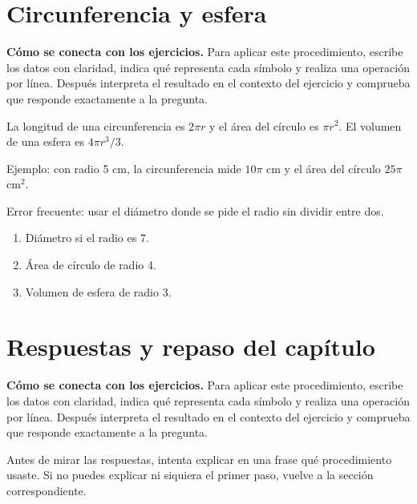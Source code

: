 \documentclass[10pt,oneside,openany]{book}
\begin{document}
\section{Circunferencia y esfera}

\textbf{Cómo se conecta con los ejercicios.} Para aplicar este procedimiento, escribe los datos con claridad, indica qué representa cada símbolo y realiza una operación por línea. Después interpreta el resultado en el contexto del ejercicio y comprueba que responde exactamente a la pregunta.

La longitud de una circunferencia es $2\pi r$ y el área del círculo es $\pi r^2$. El volumen de una esfera es $4\pi r^3/3$.

\begin{ejemplo}
Ejemplo: con radio 5 cm, la circunferencia mide $10\pi$ cm y el área del círculo $25\pi$ cm$^2$.
\end{ejemplo}

\begin{ojo}
Error frecuente: usar el diámetro donde se pide el radio sin dividir entre dos.
\end{ojo}

\begin{practica}

\begin{enumerate}

\item Diámetro si el radio es 7.

\item Área de círculo de radio 4.

\item Volumen de esfera de radio 3.

\end{enumerate}

\end{practica}



\section{Respuestas y repaso del capítulo}

\textbf{Cómo se conecta con los ejercicios.} Para aplicar este procedimiento, escribe los datos con claridad, indica qué representa cada símbolo y realiza una operación por línea. Después interpreta el resultado en el contexto del ejercicio y comprueba que responde exactamente a la pregunta.

Antes de mirar las respuestas, intenta explicar en una frase qué procedimiento usaste. Si no puedes explicar ni siquiera el primer paso, vuelve a la sección correspondiente.
\end{document}
